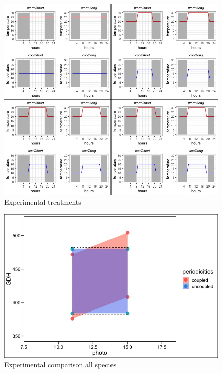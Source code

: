 \documentclass{article}[11pt]
\begin{document}
\begin{figure}[h!]
    \centering
 \includegraphics[width=\textwidth]{..//Plots/periodicity_figures/new_treats.jpeg}
    \caption{Experimental treatments}
    \label{fig:Figure 1}
\end{figure}

\begin{figure}[h!]
    \centering
 \includegraphics[width=\textwidth]{..//Plots/periodicity_figures/Uncoupled_coupled.jpeg}
    \caption{Experimental comparison all species}
    \label{fig:Figure 2}
\end{figure}
\end{document}
